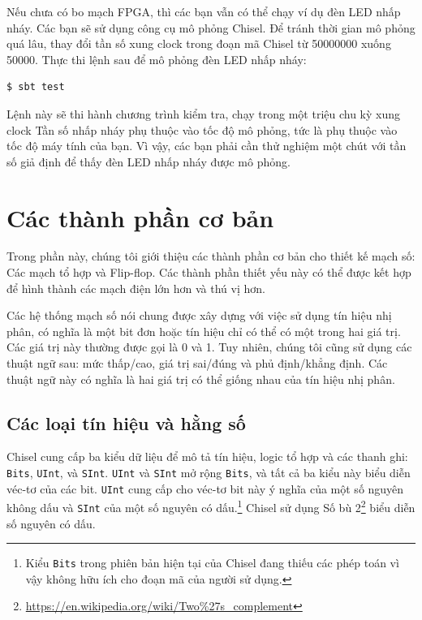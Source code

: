 \documentclass[%
    10pt,
    headinclude, footexclude,
    openright, %
    notitlepage,
    cleardoubleempty,
    headsepline,
    pointlessnumbers,
    bibtotoc, idxtotoc,
    ]{scrbook}
\newcommand{\code}[1]{{\small{\texttt{#1}}}}
\newcommand{\codefoot}[1]{{\footnotesize{\texttt{#1}}}}
\newcommand{\myref}[2]{\href{#1}{#2}}
\renewcommand{\myref}[2]{{#2}{\footnote{\url{#1}}}}
\begin{document}
Nếu chưa có bo mạch FPGA, thì các bạn vẫn có thể chạy ví dụ đèn LED nhấp nháy.
Các bạn sẽ sử dụng công cụ mô phỏng Chisel. Để tránh thời gian mô phỏng quá lâu, thay đổi
tần số xung clock trong đoạn mã Chisel từ 50000000 xuống 50000. Thực thi lệnh sau để 
mô phỏng đèn LED nhấp nháy:

\begin{verbatim}
$ sbt test
\end{verbatim}

Lệnh này sẽ thi hành chương trình kiểm tra, chạy trong một triệu chu kỳ xung clock
Tần số nhấp nháy phụ thuộc vào tốc độ mô phỏng, tức là phụ thuộc vào tốc độ máy tính của bạn.
Vì vậy, các bạn phải cần thử nghiệm một chút với tần số giả định để thấy đèn LED nhấp nháy được mô phỏng.

\chapter{Các thành phần cơ bản}

Trong phần này, chúng tôi giới thiệu các thành phần cơ bản cho thiết kế mạch số:
Các mạch tổ hợp và Flip-flop.
Các thành phần thiết yếu này có thể được kết hợp để hình thành các mạch điện lớn hơn và thú vị hơn.

Các hệ thống mạch số nói chung được xây dựng với việc sử dụng tín hiệu nhị phân, có nghĩa là một bit đơn hoặc tín hiệu 
chỉ có thể có một trong hai giá trị. Các giá trị này thường được gọi là 0 và 1. Tuy nhiên, chúng tôi 
cũng sử dụng các thuật ngữ sau: mức thấp/cao, giá trị sai/đúng và phủ định/khẳng định.
Các thuật ngữ này có nghĩa là hai giá trị có thể giống nhau của tín hiệu nhị phân.

\section{Các loại tín hiệu và hằng số}

Chisel cung cấp ba kiểu dữ liệu để mô tả tín hiệu, logic tổ hợp và các thanh ghi:
\code{Bits}, \code{UInt}, và \code{SInt}. \code{UInt} và \code{SInt} mở rộng \code{Bits},
và tất cả ba kiểu này biểu diễn véc-tơ của các bit. \code{UInt} cung cấp cho véc-tơ bit này ý nghĩa
của một số nguyên không dấu và \code{SInt} của một số nguyên có dấu.\footnote{Kiểu \codefoot{Bits} trong phiên bản 
hiện tại của Chisel đang thiếu các phép toán vì vậy không hữu ích cho đoạn mã của người sử dụng.}
Chisel sử dụng \myref{https://en.wikipedia.org/wiki/Two\%27s\_complement}{Số bù 2}
biểu diễn số nguyên có dấu.
\end{document}
